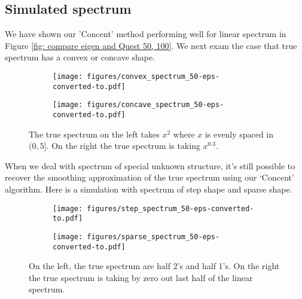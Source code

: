 \documentclass[12pt]{extarticle}
\newcommand{\1}{\field{1}}
\numberwithin{equation}{section}
\begin{document}
\subsection{Simulated spectrum}
We have shown our 'Concent' method performing well for linear spectrum in Figure \ref{fig: compare eigen and Quest 50, 100}.  We next exam the case that true spectrum has a convex or concave shape.
\begin{figure}[H] 
	\centering
	\begin{subfigure}[t]{.45\textwidth}
		\centering
		\texttt{[image: figures/convex\_spectrum\_50-eps-converted-to.pdf]}
	\end{subfigure}
	\begin{subfigure}[t]{.45\textwidth}
		\centering
		\texttt{[image: figures/concave\_spectrum\_50-eps-converted-to.pdf]}
	\end{subfigure}	
	\caption{ The true spectrum on the left takes $x^2$ where $x$ is evenly spaced in $(0,5]$. On the right the true spectrum is taking $x^{0.3}$.}\label{fig:convex and concave spectrum 50}
\end{figure}

When we deal with spectrum of special unknown structure, it's still possible to recover the smoothing approximation of the true spectrum using our `Concent' algorithm. Here is a simulation with spectrum of step shape and sparse shape.
\begin{figure}[H] 
	\centering
	\begin{subfigure}[t]{.45\textwidth}
		\centering
		\texttt{[image: figures/step\_spectrum\_50-eps-converted-to.pdf]}
	\end{subfigure}
	\begin{subfigure}[t]{.45\textwidth}
		\centering
		\texttt{[image: figures/sparse\_spectrum\_50-eps-converted-to.pdf]}
	\end{subfigure}	
	\caption{On the left, the true spectrum are half 2's and half 1's. On the right the true spectrum is taking by zero out last half of the linear spectrum.}\label{fig:structured spectrum}
\end{figure}




\end{document}
